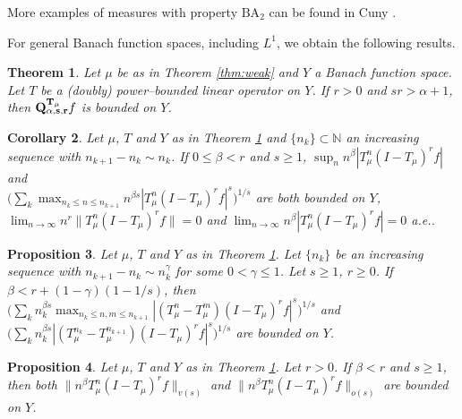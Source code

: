 \documentclass[11pt]{amsart}
\newtheorem{thm}{Theorem}[section]
\newtheorem{prop}[thm]{Proposition}
\newtheorem{cor}[thm]{Corollary}
\theoremstyle{definition}
\theoremstyle{remark}
\begin{document}
More examples of measures with property $\text{BA}_2$ can be found in Cuny \cite{Cuny-weak}.



For general Banach function spaces, including $L^1$, we obtain the following results.

\begin{thm}\label{thm:main} %
Let $\mu$ be as in Theorem \ref{thm:weak} and $Y$ a Banach function space. 
Let $T$ be a (doubly) power--bounded linear operator on $Y$.
 If $r>0$ and  $sr>\alpha+1$, then ${\bf Q_{\alpha,s,r}^{T_{\mu}}}f$ is bounded  on $Y$. 
\end{thm} 




\begin{cor} \label{cor:sup} 
Let $\mu$, $T$ and $Y$ as in Theorem \ref{thm:main} and $\{n_k\}\subset \mathbb N$ an increasing sequence with $n_{k+1}-n_k\sim n_k$.
If $0\le \beta<r$ and $s\ge 1$,
$\sup_n n^{\beta} |T_{\mu}^n (I- T_{\mu})^{r}f|$ and \\ $\Big( \sum_k \max_{n_{k}\le n\le n_{k+1}} n^{\beta s} |T_{\mu}^{n}(I-T_{\mu})^{r} f|^s\Big)^{1/s} $
are both bounded on $Y$, 
$\lim_{n\to \infty} n^{r} \lVert T_{\mu}^n (I- T_{\mu})^{r}f \rVert = 0$ and
 $\lim_{n\to \infty} n^{\beta} |T_{\mu}^n (I- T_{\mu})^{r}f | = 0$
 a.e..
\end{cor}



\begin{prop} \label{prop:longvar}
Let $\mu$, $T$ and $Y$ as in Theorem \ref{thm:main}.
Let  $\{n_k\}$ be an increasing sequence with $n_{k+1} -n_k \sim n_k^{\gamma}$ 
for some $0<\gamma\le 1$. Let $s\ge 1$, $r\ge 0$. 
If  $\beta<r+(1-\gamma)(1-1/s)$, 
 then 
$\Big( \sum_k n_k^{\beta s}  \max_{ n_k\le n,m\le n_{k+1} } |(T_{\mu}^n -T_{\mu}^{m})(I-T_{\mu})^r f|^s \Big)^{1/s} $ and  
$\Big( \sum_k n_k^{\beta s} |(T_{\mu}^{n_k}-T_{\mu}^{n_{k+1}})(I-T_{\mu})^rf|^s \Big)^{1/s}$ are bounded on $Y$. 
\end{prop}




\begin{prop} \label{prop:genvar}
Let $\mu$, $T$ and $Y$ as in Theorem \ref{thm:main}.
Let $r> 0$.
 If  $\beta< r$ and $s\ge 1$,        
then both   $\lVert n^{\beta} T_{\mu}^n(I-T_{\mu})^r f \rVert_{v(s)}$ 
 and
 $\lVert n^{\beta} T_{\mu}^n(I-T_{\mu})^r f \rVert_{o(s)}$ are bounded on $Y$.


\end{prop}
\end{document}
